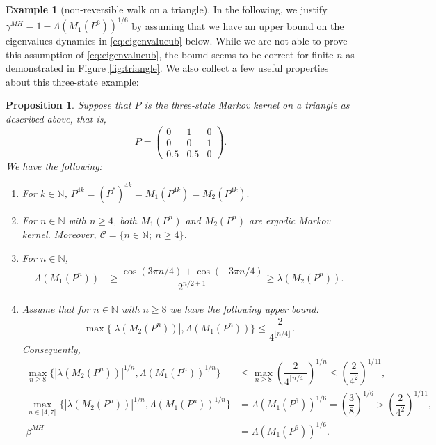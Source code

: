 \documentclass[12pt,a4]{amsart}
\numberwithin{equation}{section}
\theoremstyle{plain}
\newtheorem{proposition}{Proposition}[section]
\theoremstyle{definition}
\newtheorem{example}{Example}[section]
\theoremstyle{remark}
\newcommand{\1}{\mathds{1}}
\renewcommand{\leq}{\leqslant}
\renewcommand{\geq}{\geqslant}
\begin{document}
\begin{example}[non-reversible walk on a triangle]
	In the following, we justify $\gamma^{MH} = 1 - \Lambda(M_1(P^6))^{1/6}$ by assuming that we have an upper bound on the eigenvalues dynamics in \eqref{eq:eigenvalueub} below. While we are not able to prove this assumption of \eqref{eq:eigenvalueub}, the bound seems to be correct for finite $n$ as demonstrated in Figure \ref{fig:triangle}. We also collect a few useful properties about this three-state example:
	\begin{proposition}
		Suppose that $P$ is the three-state Markov kernel on a triangle as described above, that is,
		$$P = \begin{pmatrix} 
		0 & 1 & 0 \\ 
		0 & 0 & 1 \\ 
		0.5 & 0.5 & 0  
		\end{pmatrix}.$$		
		We have the following:
		\begin{enumerate}
			\item\label{it:triangle1} For $k \in \mathbb{N}$, $P^{4k} = (P^*)^{4k} = M_1(P^{4k}) = M_2(P^{4k}).$
			\item\label{it:triangle2} For $n \in \mathbb{N}$ with $n \geq 4$, both $M_1(P^n)$ and $M_2(P^n)$ are ergodic Markov kernel. Moreover, $\mathcal{C} = \{n \in \mathbb{N};~n \geq 4\}$.
			\item\label{it:triangle3} For $n \in \mathbb{N}$,
			\begin{align*}
				\Lambda(M_1(P^n)) &\geq \dfrac{\cos(3\pi n/4) + \cos(-3\pi n/4)}{2^{n/2+1}} \geq \lambda(M_2(P^n)).
			\end{align*}
			\item\label{it:triangle4} Assume that for $n \in \mathbb{N}$ with $n \geq 8$ we have the following upper bound:
			\begin{align}\label{eq:eigenvalueub}
				\max \{|\lambda(M_2(P^n))|, \Lambda(M_1(P^n))\} \leq \dfrac{2}{4^{\lfloor n/4\rfloor}}.
			\end{align}
			Consequently, 
			\begin{align*}
				\max_{n \geq 8} \{|\lambda(M_2(P^n))|^{1/n}, \Lambda(M_1(P^n))^{1/n}\} &\leq \max_{n \geq 8} \left(\dfrac{2}{4^{\lfloor n/4\rfloor}}\right)^{1/n} \leq \left(\dfrac{2}{4^2}\right)^{1/11}, \\
				\max_{n \in \llbracket 4,7 \rrbracket}\{ |\lambda(M_2(P^n))|^{1/n}, \Lambda(M_1(P^n))^{1/n} \} &= \Lambda(M_1(P^6))^{1/6} = \left(\dfrac{3}{8}\right)^{1/6} > \left(\dfrac{2}{4^2}\right)^{1/11}, \\
				\beta^{MH} &= \Lambda(M_1(P^6))^{1/6}.
			\end{align*}

\end{enumerate}
\end{proposition}
\end{example}
\end{document}
